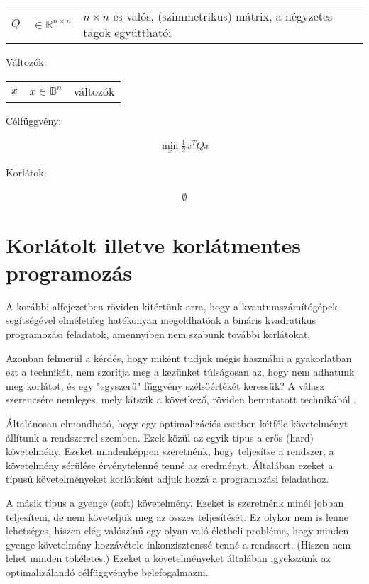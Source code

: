 \begin{tabular}{lll}
	$Q$ & $\in \mathbb{R}^{n×n}$  & $n × n$-es valós, (szimmetrikus) mátrix, a négyzetes tagok együtthatói \\
\end{tabular}

Változók:

\begin{tabular}{lll}
	$x$ & $x \in \mathbb{B}^n$ & változók \\
\end{tabular}

Célfüggvény:

\begin{align}
	\min_{x} \frac{1}{2} x^T Q x
\end{align}

Korlátok:

\begin{align}
	\emptyset
\end{align}



\section{Korlátolt illetve korlátmentes programozás}

A korábbi alfejezetben röviden kitértünk arra, hogy a kvantumszámítógépek segítségével elméletileg hatékonyan megoldhatóak a bináris kvadratikus programozási feladatok, amennyiben nem szabunk további korlátokat.

Azonban felmerül a kérdés, hogy miként tudjuk mégis használni a gyakorlatban ezt a technikát, nem szorítja meg a kezünket túlságosan az, hogy nem adhatunk meg korlátot, és egy "egyszerű" függvény szélsőértékét keressük? A válasz szerencsére nemleges, mely látszik a következő, röviden bemutatott technikából \cite{DBLP:journals/corr/abs-1811-11538}. 

Általánosan elmondható, hogy egy optimalizációs esetben kétféle követelményt állítunk a rendszerrel szemben. Ezek közül az egyik típus a erős (hard) követelmény. Ezeket mindenképpen szeretnénk, hogy teljesítse a rendszer, a követelmény sérülése érvénytelenné tenné az eredményt. Általában ezeket a típusú követelményeket korlátként adjuk hozzá a programozási feladathoz.

A másik típus a gyenge (soft) követelmény. Ezeket is szeretnénk minél jobban teljesíteni, de nem követeljük meg az összes teljesítését. Ez olykor nem is lenne lehetséges, hiszen elég valószínű egy olyan való életbeli probléma, hogy minden gyenge követelmény hozzávétele inkonzisztenssé tenné a rendszert. (Hiszen nem lehet minden tökéletes.) Ezeket a követelményeket általában igyekszünk az optimalizálandó célfüggvénybe belefogalmazni.

